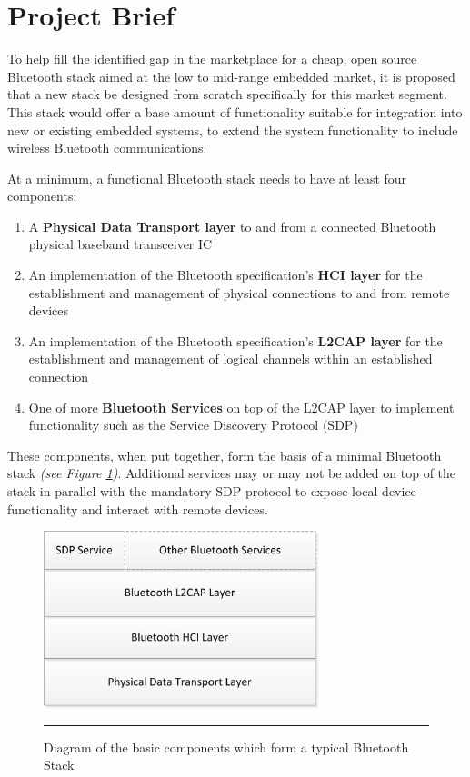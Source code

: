 \section{Project Brief}

To help fill the identified gap in the marketplace for a cheap, open source Bluetooth stack aimed at the low to mid-range embedded market, it is proposed that a new stack be designed from scratch specifically for this market segment. This stack would offer a base amount of functionality suitable for integration into new or existing embedded systems, to extend the system functionality to include wireless Bluetooth communications.

At a minimum, a functional Bluetooth stack needs to have at least four components:

\begin{enumerate}
	\item A \textbf{Physical Data Transport layer} to and from a connected Bluetooth physical baseband transceiver IC
	\item An implementation of the Bluetooth specification's \textbf{HCI layer} for the establishment and management of physical connections to and from remote devices
	\item An implementation of the Bluetooth specification's \textbf{L2CAP layer} for the establishment and management of logical channels within an established connection
	\item One of more \textbf{Bluetooth Services} on top of the L2CAP layer to implement functionality such as the Service Discovery Protocol (SDP)
\end{enumerate}

These components, when put together, form the basis of a minimal Bluetooth stack \emph{(see Figure \ref{fig:btstack})}. Additional services may or may not be added on top of the stack in parallel with the mandatory SDP protocol to expose local device functionality and interact with remote devices.

\begin{figure}[tbpH]
	\centering
		\includegraphics[width=80mm]{./Figures/BluetoothStack.png}
	\rule{35em}{0.5pt}
	\caption[Diagram of a typical Bluetooth Stack]{Diagram of the basic components which form a typical Bluetooth Stack}
	\label{fig:btstack}
\end{figure}

